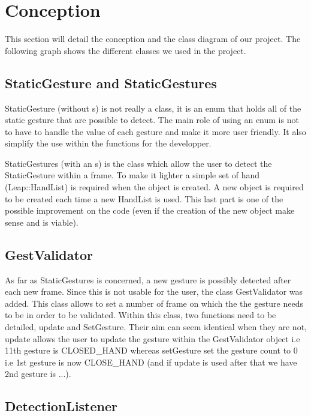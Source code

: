 \section{Conception}

This section will detail the conception and the class diagram of our project. The following graph shows the different classes we used in the project.
%
%  

\subsection{StaticGesture and StaticGestures}

StaticGesture (without s) is not really a class, it is an enum that holds all of the static gesture that are possible to detect. The main role of using an enum is not to have to handle the value of each gesture and make it more user friendly. It also simplify the use within the functions for the developper.

StaticGestures (with an s) is the class which allow the user to detect the StaticGesture within a frame. To make it lighter a simple set of hand (Leap::HandList) is required when the object is created. A new object is required to be created each time a new HandList is used. This last part is one of the possible improvement on the code (even if the creation of the new object make sense and is viable).

\subsection{GestValidator}

As far as StaticGestures is concerned, a new gesture is possibly detected after each new frame. Since this is not usable for the user, the class GestValidator was added. This class allows to set a number of frame on which the the gesture needs to be in order to be validated.
Within this class, two functions need to be detailed, update and SetGesture. Their aim can seem identical when they are not, update allows the user to update the gesture within the GestValidator object i.e 11th gesture is CLOSED\_HAND whereas setGesture set the gesture count to 0 i.e 1st gesture is now CLOSE\_HAND (and if update is used after that we have 2nd gesture is ...).

\subsection{DetectionListener}

